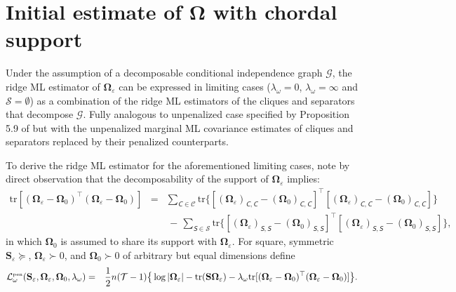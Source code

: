 \newpage
\section{Initial estimate of $\mathbf{\Omega}$ with chordal support}
Under the assumption of a decomposable conditional independence graph $\mathcal{G}$, the ridge ML estimator of $\mathbf{\Omega}_{\varepsilon}$ can be expressed in limiting cases ($\lambda_{\omega}=0$, $\lambda_{\omega}=\infty$ and $\mathcal{S} = \emptyset$) as a combination of the ridge ML estimators of the cliques and separators that decompose $\mathcal{G}$. Fully analogous to unpenalized case specified by Proposition 5.9 of \cite{Lauritzen1996} but with the unpenalized marginal ML covariance estimates of cliques and separators replaced by their penalized counterparts.

To derive the ridge ML estimator for the aforementioned limiting cases, note by direct observation that the decomposability of the support of $\mathbf{\Omega}_{\varepsilon}$ implies:
\begin{eqnarray}
\nonumber
\mbox{tr}  [ (\mathbf{\Omega}_{\varepsilon} - \mathbf{\Omega}_0)^\top (\mathbf{\Omega}_{\varepsilon} - \mathbf{\Omega}_0)]
& = & \sum_{\mathsfit{C} \in \mathcal{C}} \mbox{tr} \{ [ (\mathbf{\Omega}_{\varepsilon})_{\mathsfit{C},\mathsfit{C}} - (\mathbf{\Omega}_0)_{\mathsfit{C}, \mathsfit{C}} ]^{\top} [(\mathbf{\Omega}_{\varepsilon})_{\mathsfit{C},\mathsfit{C}} - (\mathbf{\Omega}_0)_{\mathsfit{C}, \mathsfit{C}}] \}
\\
\label{form.reformulatedRidgePanelty}
& &  \, - \, \sum_{\mathsfit{S} \in \mathcal{S}} \mbox{tr} \{ [ (\mathbf{\Omega}_{\varepsilon})_{\mathsfit{S},\mathsfit{S}} - (\mathbf{\Omega}_0)_{\mathsfit{S}, \mathsfit{S}} ]^{\top} [(\mathbf{\Omega}_{\varepsilon})_{\mathsfit{S}, \mathsfit{S}} - (\mathbf{\Omega}_0)_{\mathsfit{S}, \mathsfit{S}}] \},
\end{eqnarray}
in which $\mathbf{\Omega}_0$ is assumed to share its support with $\mathbf{\Omega}_{\varepsilon}$. For square, symmetric $\mathbf{S}_{\varepsilon} \succeq$, $\mathbf{\Omega}_{\varepsilon} \succ 0$, and $\mathbf{\Omega}_0 \succ 0$ of arbitrary but equal dimensions define
\begin{eqnarray*}
\mathcal{L}_{\omega}^{\mbox{{\tiny pen}}}(\mathbf{S}_{\varepsilon}, \mathbf{\Omega}_{\varepsilon}, \mathbf{\Omega}_0, \lambda_{\omega}) & = & \frac{1}{2} n (\mathcal{T} - 1) \big\{ \log| \mathbf{\Omega}_{\varepsilon} |   - \mbox{tr}  ( \mathbf{S}  \mathbf{\Omega}_{\varepsilon} ) - \lambda_{\omega} \mbox{tr}  [ (\mathbf{\Omega}_{\varepsilon} -\mathbf{\Omega}_0)^{\top} (\mathbf{\Omega}_{\varepsilon} - \mathbf{\Omega}_0) ] \big\}.
\end{eqnarray*}
